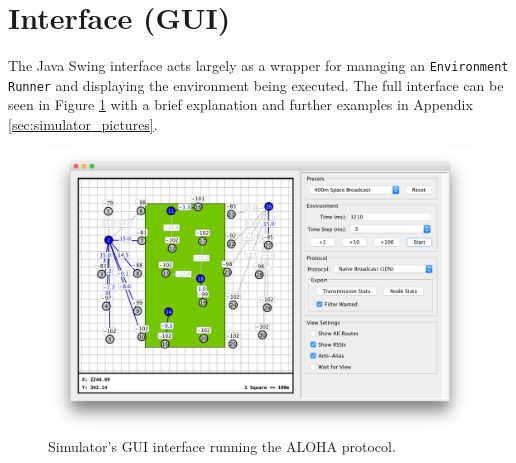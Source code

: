 \section{Interface (GUI)}
The Java Swing interface acts largely as a wrapper for managing an \texttt{Environment} \texttt{Runner} and displaying the environment being executed. The full interface can be seen in Figure \ref{fig:sim_interface_main} with a brief explanation and further examples in Appendix \ref{sec:simulator_pictures}. 

\begin{figure}[H]
    \centering
   	\includegraphics[width=\textwidth]{Figures/simulator_main}
    \caption[Simulator GUI example]{ 
    	Simulator's GUI interface running the ALOHA protocol.
    	}
    \label{fig:sim_interface_main}
\end{figure}





